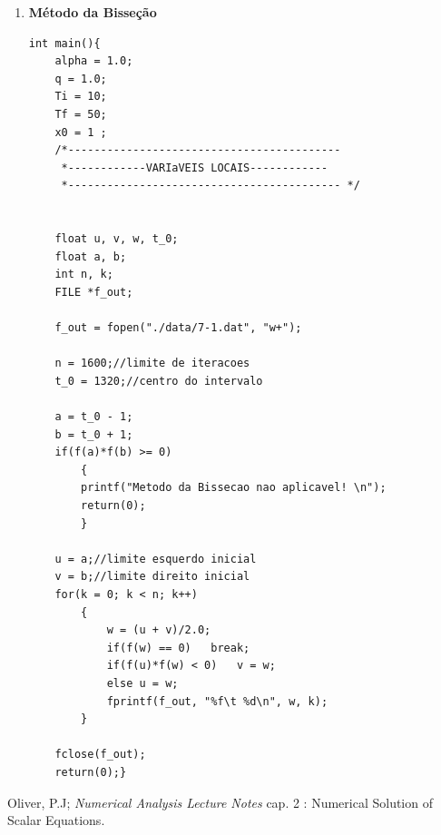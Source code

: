 \documentclass[a4paper,11pt]{article}
\begin{document}
\begin{enumerate}
\begin{lstlisting}
	alpha = 1.0;
	q = 1.0;
	Ti = 10;
	Tf = 50;
	x0 = 1 ;

	/*------------------------------------------
	 *------------VARIaVEIS LOCAIS--------------
	 *------------------------------------------ */
	FILE *f_out;
	float t, t_ant, t_0; 
	//t anterior e t inicial
	int n_iterations;//indexa iteracao
	
	f_out = fopen("./data/6.dat", "w");

	t = t_0;
	for(n_iterations = 0 ; n_iterations <= 100; n_iterations ++)
		{
		t_ant = t;
		//guaradamos t_ant para comparacao de precisao 
		t = g(t);
		if((int)(t*pow(10, 2) - t_ant*pow(10, 2)) == 0) break;
		//precisao de 6 digitos			
		}//end for
	fprintf(f_out, "%.3f \t %d \n", t, n_iterations);

	fclose(f_out);
return(0);}
     	\end{lstlisting}   
\newpage
\item \textbf{Método da Bisseção} 

\begin{lstlisting}   
int main(){
	alpha = 1.0;
	q = 1.0;
	Ti = 10;
	Tf = 50;
	x0 = 1 ;
	/*------------------------------------------
	 *------------VARIaVEIS LOCAIS------------
	 *------------------------------------------ */


	float u, v, w, t_0;
	float a, b;
	int n, k;
	FILE *f_out;

	f_out = fopen("./data/7-1.dat", "w+");

	n = 1600;//limite de iteracoes
	t_0 = 1320;//centro do intervalo

	a = t_0 - 1;
	b = t_0 + 1;
	if(f(a)*f(b) >= 0)
		{
		printf("Metodo da Bissecao nao aplicavel! \n");
		return(0);
		}

	u = a;//limite esquerdo inicial
	v = b;//limite direito inicial
	for(k = 0; k < n; k++)
		{
			w = (u + v)/2.0;
			if(f(w) == 0)	break;
			if(f(u)*f(w) < 0)	v = w;
			else u = w;
			fprintf(f_out, "%f\t %d\n", w, k);
		}

	fclose(f_out);
	return(0);}
\end{lstlisting}   

   \end{enumerate}
   

\begin{thebibliography}{9}    
   		Oliver, P.J;
  		\emph{Numerical Analysis Lecture Notes} cap. 2 : Numerical Solution of Scalar Equations.
\end{thebibliography}
\end{document}

